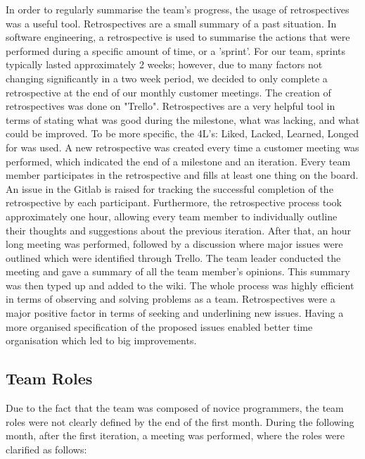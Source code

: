 \documentclass{l3proj}
\begin{document}
In order to regularly summarise the team's progress, the usage of retrospectives was a useful tool. Retrospectives are a small summary of a past situation. In software engineering, a retrospective is used to summarise the actions that were performed during a specific amount of time, or a 'sprint'. For our team, sprints typically lasted approximately 2 weeks; however, due to many factors not changing significantly in a two week period, we decided to only complete a retrospective at the end of our monthly customer meetings. The creation of retrospectives was done on "Trello". Retrospectives are a very helpful tool in terms of stating what was good during the milestone, what was lacking, and what could be improved. To be more specific, the 4L's: Liked, Lacked, Learned, Longed for was used. A new retrospective was created every time a customer meeting was performed, which indicated the end of a milestone and an iteration. Every team member participates in the retrospective and fills at least one thing on the board. An issue in the Gitlab is raised for tracking the successful completion of the retrospective by each participant. Furthermore, the retrospective process took approximately one hour, allowing every team member to individually outline their thoughts and suggestions about the previous iteration. After that, an hour long meeting was performed, followed by a discussion where major issues were outlined which were identified through Trello. The team leader conducted the meeting and gave a summary of all the team member's opinions. This summary was then typed up and added to the wiki. The whole process was highly efficient in terms of observing and solving problems as a team. Retrospectives were a major positive factor in terms of seeking and underlining new issues. Having a more organised specification of the proposed issues enabled better time organisation which led to big improvements.

\subsection{Team Roles}
\label{roles}

Due to the fact that the team was composed of novice programmers, the team roles were not clearly defined by the end of the first month. During the following month, after the first iteration, a meeting was performed, where the roles were clarified as follows:
\end{document}
